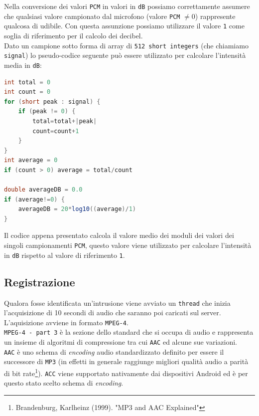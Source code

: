 Nella conversione dei valori \texttt{PCM} in valori in \texttt{dB} possiamo correttamente assumere che qualsiasi valore campionato dal microfono (valore \texttt{PCM} $\neq 0$) rappresente qualcosa di udibile. Con questa assunzione possiamo utilizzare il valore \texttt{1} come soglia di riferimento per il calcolo dei decibel.\\

Dato un campione sotto forma di array di \texttt{512 short integers} (che chiamiamo \texttt{signal}) lo pseudo-codice seguente può essere utilizzato per calcolare l'intensità media in \texttt{dB}:

\begin{lstlisting}[language=Java, caption=Pseudocode for computing dB from PCM samples]
int total = 0
int count = 0
for (short peak : signal) {
	if (peak != 0) {
		total=total+|peak|
		count=count+1
	}
}
int average = 0
if (count > 0) average = total/count

double averageDB = 0.0
if (average!=0) {
	averageDB = 20*log10((average)/1)
}
\end{lstlisting}

Il codice appena presentato calcola il valore medio dei moduli dei valori dei singoli campionamenti \texttt{PCM}, questo valore viene utilizzato per calcolare l'intensità in \texttt{dB} rispetto al valore di riferimento \texttt{1}.

\subsection{Registrazione}
Qualora fosse identificata un'intrusione viene avviato un \texttt{thread} che inizia l'acquisizione di 10 secondi di audio che saranno poi caricati sul server.\\

L'aquisizione avviene in formato \texttt{MPEG-4}.\\

\texttt{MPEG-4 - part 3} è la sezione dello standard che si occupa di audio e rappresenta un insieme di algoritmi di compressione tra cui \texttt{AAC} ed alcune sue variazioni.\\

\texttt{AAC} è uno schema di \textit{encoding} audio standardizzato definito per essere il successore di \texttt{MP3} (in effetti in generale raggiunge migliori qualità audio a parità di bit rate\footnote{Brandenburg, Karlheinz (1999). "MP3 and AAC Explained"}). \texttt{ACC} viene supportato nativamente dai dispositivi Android ed è per questo stato scelto schema di \textit{encoding}.\\

